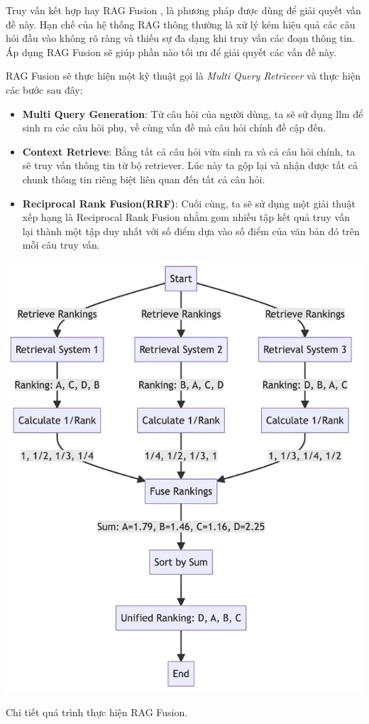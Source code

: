 \documentclass[a4paper, 12pt, openany]{book}
\begin{document}
Truy vấn kết hợp hay RAG Fusion \cite{Rackauckas_2024}, là phương pháp được dùng để giải quyết vấn đề này.
Hạn chế của hệ thống RAG thông thường là xử lý kém hiệu quả các câu hỏi đầu vào không rõ ràng và thiếu sự đa dạng
khi truy vấn các đoạn thông tin. Áp dụng RAG Fusion sẽ giúp phần nào tối ưu để giải quyết các vấn đề này.

RAG Fusion sẽ thực hiện một kỹ thuật gọi là \textit{Multi Query Retriever} và thực hiện các bước sau đây:

\begin{itemize}
    \item \textbf{Multi Query Generation}: Từ câu hỏi của người dùng, ta sẽ sử dụng \ac{llm} để sinh ra các câu hỏi phụ, về cùng vấn đề mà câu hỏi chính đề cập đến.
    \item \textbf{Context Retrieve}: Bằng tất cả câu hỏi vừa sinh ra và cả câu hỏi chính, ta sẽ truy vấn thông tin từ bộ retriever. Lúc này ta gộp lại và nhận được
    tất cả chunk thông tin riêng biệt liên quan đến tất cả câu hỏi.
    \item \textbf{Reciprocal Rank Fusion(RRF)}: Cuối cùng, ta sẽ sử dụng một giải thuật xếp hạng là Reciprocal Rank Fusion nhằm gom nhiều tập kết quả truy vấn lại thành một tập duy nhất với số điểm dựa vào số điểm của
    văn bản đó trên mỗi câu truy vấn. 
\end{itemize}

\vspace{0.5cm}
\begin{minipage}{\linewidth}
    \centering
    \includegraphics[width=.9\linewidth]{./assets/images/fusion-flow.png}
    \captionsetup{type=figure}
    \caption{Chi tiết quá trình thực hiện RAG Fusion.}
\end{minipage}
\vspace{0.5cm}
\end{document}
